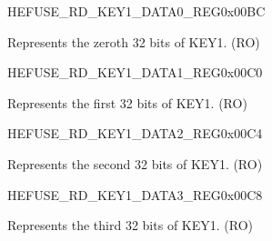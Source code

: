 \begin{register}{H}{EFUSE\_RD\_KEY1\_DATA0\_REG}{0x00BC}\label{regdesc:EFUSERDKEY1DATA0REG}
%
\regnewline%
\begin{regdesc}\begin{reglist}
\label{fielddesc:EFUSEKEY1DATA0}\item [EFUSE\_KEY1\_DATA0] Represents the zeroth 32 bits of KEY1. (RO)
\end{reglist}\end{regdesc}
\end{register}


\begin{register}{H}{EFUSE\_RD\_KEY1\_DATA1\_REG}{0x00C0}\label{regdesc:EFUSERDKEY1DATA1REG}
%
\regnewline%
\begin{regdesc}\begin{reglist}
\label{fielddesc:EFUSEKEY1DATA1}\item [EFUSE\_KEY1\_DATA1] Represents the first 32 bits of KEY1. (RO)
\end{reglist}\end{regdesc}
\end{register}


\begin{register}{H}{EFUSE\_RD\_KEY1\_DATA2\_REG}{0x00C4}\label{regdesc:EFUSERDKEY1DATA2REG}
%
\regnewline%
\begin{regdesc}\begin{reglist}
\label{fielddesc:EFUSEKEY1DATA2}\item [EFUSE\_KEY1\_DATA2] Represents the second 32 bits of KEY1. (RO)
\end{reglist}\end{regdesc}
\end{register}


\begin{register}{H}{EFUSE\_RD\_KEY1\_DATA3\_REG}{0x00C8}\label{regdesc:EFUSERDKEY1DATA3REG}
%
\regnewline%
\begin{regdesc}\begin{reglist}
\label{fielddesc:EFUSEKEY1DATA3}\item [EFUSE\_KEY1\_DATA3] Represents the third 32 bits of KEY1. (RO)
\end{reglist}\end{regdesc}
\end{register}


